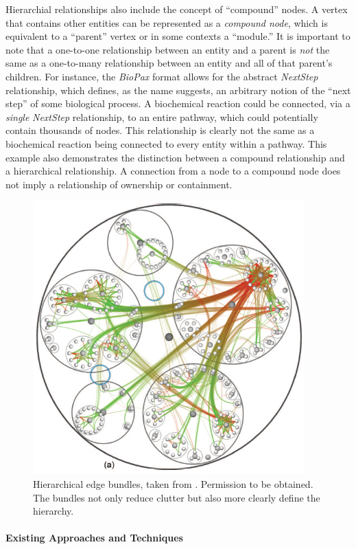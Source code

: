 Hierarchial relationships also include the concept of ``compound'' nodes.
A vertex that contains other entities can be represented as a \textit{compound node}, which is equivalent to a ``parent'' vertex or in some contexts a ``module.'' It is important to note that a one-to-one relationship between an entity and a parent is \textit{not} the same as a one-to-many relationship between an entity and all of that parent's children.
For instance, the \textit{BioPax} format allows for the abstract \emph{NextStep} relationship, which defines, as the name suggests, an arbitrary notion of the ``next step'' of some biological process.
A biochemical reaction could be connected, via a \textit{single} \emph{NextStep} relationship, to an entire pathway, which could potentially contain thousands of nodes.
This relationship is clearly not the same as a biochemical reaction being connected to every entity within a pathway.
This example also demonstrates the distinction between a compound relationship and a hierarchical relationship.
A connection from a node to a compound node does not imply a relationship of ownership or containment.

\begin{figure}[htb]
  \centering
  \includegraphics[width=0.5\columnwidth]{figures/Hierarchical_edge_bundles}
  \caption{\label{fig:Hierarchical_edge_bundles} Hierarchical edge bundles, taken from \cite{Holten2006}. Permission to be obtained. The bundles not only reduce clutter but also more clearly define the hierarchy.}
\end{figure}

\paragraph*{Existing Approaches and Techniques}

